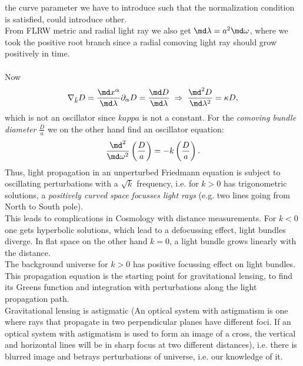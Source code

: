 	the curve parameter we have to introduce such that the normalization condition is satisfied, could introduce other.\\
	From FLRW metric and radial light ray we also get $\md \lambda = a^2\md \omega$,
	where we took the positive root branch since a radial comoving light ray should grow positively in time.\\
	\\
	Now 
	\begin{equation}
		\nabla_{\tilde{k}} D = \frac{\md x^{\alpha}}{\md \lambda} \partial_{\alpha} D = \frac{\md D}{\md \lambda} \; \Rightarrow\; \frac{\md^2 D}{\md \lambda^2} =\kappa D,
	\end{equation}
	which is not an oscillator since $kappa$ is not a constant. For the \emph{comoving bundle diameter} $\frac{D}{a}$ we on the other hand find an oscillator equation:
	\begin{equation}
		\frac{\md^2 }{\md \omega^2} \left(\frac{D}{a}\right) = - k \left(\frac{D}{a}\right).
	\end{equation}
	Thus, light propagation in an unperturbed Friedmann equation is subject to oscillating perturbations with a $\sqrt{k}$ frequency, i.e. for $k>0$ has trigonometric solutions, a \emph{positively curved space focusses light rays} (e.g. two lines going from North to South pole).\\
	This leads to complications in Cosmology with distance measurements. For $k<0$ one gets hyperbolic solutions, which lead to a defocussing effect, light bundles diverge. In flat space on the other hand $k=0$, a light bundle grows linearly with the distance.\\
	The background universe for $k>0$ has positive focussing effect on light bundles. This propagation equation is the starting point for gravitational lensing, to find its Greens function and integration with perturbations along the light propagation path.\\
	Gravitational lensing is astigmatic (An optical system with astigmatism is one where rays that propagate in two perpendicular planes have different foci. If an optical system with astigmatism is used to form an image of a cross, the vertical and horizontal lines will be in sharp focus at two different distances), i.e. there is blurred image and betrays perturbations of universe, i.e. our knowledge of it.


